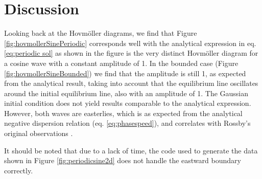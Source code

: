 \section{Discussion}
\label{sec:discussion}

Looking back at the Hovmöller diagrams, we find that Figure \ref{fig:hovmollerSinePeriodic} corresponds well with the analytical expression in eq. \ref{eq:periodic sol} as shown in the figure is the very distinct Hovmöller diagram for a cosine wave with a constant amplitude of 1. In the bounded case (Figure \ref{fig:hovmollerSineBounded}) we find that the amplitude is still 1, as expected from the analytical result, taking into account that the equilibrium line oscillates around the initial equilibrium line, also with an amplitude of 1. The Gaussian initial condition does not yield results comparable to the analytical expression. However, both waves are easterlies, which is as expected from the analytical negative dispersion relation (eq. \ref{eq:phasespeed}), and correlates with Rossby's original observations \citep{rossby}. 

It should be noted that due to a lack of time, the code used to generate the data shown in Figure \ref{fig:periodicsine2d} does not handle the eastward boundary correctly. 
